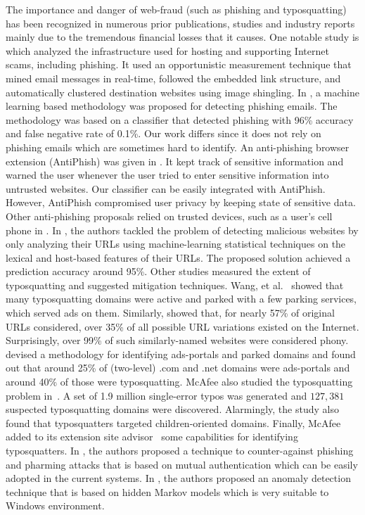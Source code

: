 \documentclass[twocolumn]{article}
\begin{document}
The importance and danger of web-fraud (such as phishing and typosquatting)
has been recognized in numerous prior publications, studies and industry 
reports mainly due to the tremendous financial losses 
\cite{phishloss2007} that it causes. One notable study is \cite{spamscatter} which analyzed the
infrastructure used for hosting and supporting Internet scams, including
phishing. It used an opportunistic measurement technique that 
mined email messages in real-time, followed the embedded
link structure, and automatically clustered destination websites using image
shingling. In \cite{learnphishemails},  a machine learning based methodology was 
proposed for detecting phishing emails. The methodology was based on a classifier 
that detected phishing with 96\% accuracy and false negative rate of 0.1\%. Our work 
differs since it does not rely on phishing emails which are sometimes hard to identify.
An anti-phishing browser extension (AntiPhish) was given in \cite{protectphish}.
It kept track of sensitive information and warned the user whenever the user tried to
enter sensitive information into untrusted websites. Our classifier 
can be easily integrated with AntiPhish. However, AntiPhish compromised user privacy 
by keeping state of sensitive data. Other anti-phishing proposals relied on trusted 
devices, such as a user's cell phone in \cite{phoolproof}. In \cite{beyond-blacklists}, 
the authors tackled the problem of detecting malicious
websites by only analyzing their URLs using machine-learning
statistical techniques on the lexical and host-based
features of their URLs. The proposed solution achieved a prediction
accuracy around 95\%. Other studies measured the extent of typosquatting and suggested
mitigation techniques. Wang, et al.~\cite{Wang} showed that many 
typosquatting domains were active and parked with a few parking services, which served
ads on them. Similarly, \cite{jaal} showed that, for nearly 57\% of original URLs considered,
over 35\% of all possible URL variations existed on the Internet. Surprisingly, over
99\% of such similarly-named websites were considered phony. \cite{ads-portal-class} devised a methodology 
for identifying ads-portals and parked domains and found out that around 25\% of (two-level) 
.com and .net  domains were ads-portals and around 40\% of those were typosquatting. 
McAfee also studied the typosquatting problem in~\cite{mcafeestudy}. A set of 1.9 million
single-error typos was generated and  $127,381$ suspected typosquatting domains
were discovered. Alarmingly, the study also found that typosquatters targeted children-oriented domains.
Finally, McAfee added to its extension site advisor~\cite{siteadvisor}  some
capabilities for identifying typosquatters. In \cite{nwjournal-phish-1}, the authors proposed a technique to counter-against phishing and pharming attacks that is based on mutual authentication which can be easily adopted in the current systems. In \cite{nwjournal-phish-2}, the authors proposed an anomaly detection technique that is based on hidden Markov models which is very suitable to Windows environment.
\end{document}
